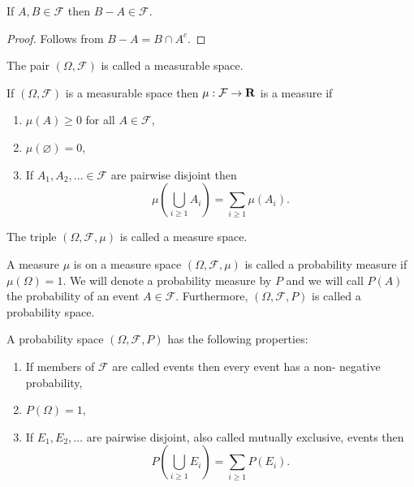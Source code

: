 \begin{prop}\label{c1s1p3}
If $A, B \in \mathcal{F}$ then $B - A \in \mathcal{F}$.
\end{prop}
\begin{proof}
Follows from $B - A = B \cap A^c$.
\end{proof}

\begin{defn}\label{c1s1d2}
The pair $(\Omega, \mathcal{F})$ is called a measurable space.
\end{defn}

\begin{defn}\label{c1s1d3}
If $(\Omega, \mathcal{F})$ is a measurable space then $\mu: \mathcal{F} 
\rightarrow \mathbf{R}$ is a measure if
\begin{enumerate}
\item $\mu(A) \ge 0$ for all $A \in \mathcal{F}$,
\item $\mu(\varnothing) = 0$,
\item If $A_1, A_2, \ldots \in \mathcal{F}$ are pairwise disjoint then
\[
\mu\left(\bigcup_{i \ge 1}A_i\right) = \sum_{i \ge 1}\mu(A_i).
\]
\end{enumerate}
\end{defn}

\begin{defn}\label{c1s1d4}
The triple $(\Omega, \mathcal{F}, \mu)$ is called a measure space.
\end{defn}

\begin{defn}\label{c1s1d5}
A measure $\mu$ is on a measure space $(\Omega, \mathcal{F}, \mu)$ is called a
probability measure if $\mu(\Omega) = 1$. We will denote a probability measure
by $P$ and we will call $P(A)$ the probability of an event $A \in \mathcal{F}$.
Furthermore, $(\Omega, \mathcal{F}, P)$ is called a probability space.
\end{defn}

A probability space $(\Omega, \mathcal{F}, P)$ has the following properties:
\begin{enumerate}
\item If members of $\mathcal{F}$ are called events then every event has a non-
negative probability,
\item $P(\Omega) = 1$,
\item If $E_1, E_2, \ldots$ are pairwise disjoint, also called mutually 
exclusive, events then 
\[
P\left(\bigcup_{i \ge 1}E_i\right) = \sum_{i \ge 1}P(E_i).
\]
\end{enumerate}

